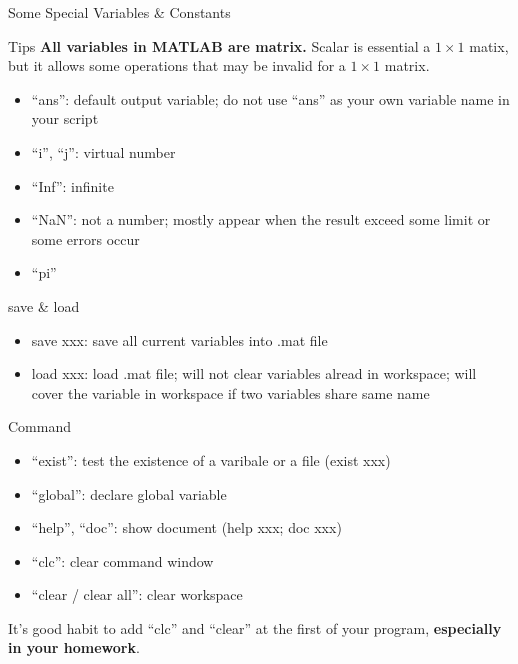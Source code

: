 \begin{frame}{Some Special Variables \& Constants}
\begin{block}{Tips}
\textbf{All variables in MATLAB are matrix.} Scalar is essential a $1\times1$ matix, but it allows some operations that may be invalid for a $1\times1$ matrix.
\end{block}
\begin{itemize}
\item ``ans'': default output variable; do not use ``ans'' as your own variable name in your script
\item ``i'', ``j'': virtual number
\item ``Inf'': infinite
\item ``NaN'': not a number; mostly appear when the result exceed some limit or some errors occur
\item ``pi''
\end{itemize}

\begin{block}{save \& load}
\begin{itemize}
\item save xxx: save all current variables into .mat file
\item load xxx: load .mat file; will not clear variables alread in workspace; will cover the variable in workspace if two variables share same name
\end{itemize}
\end{block}
\end{frame}

\begin{frame}{Command}
\begin{itemize}
\item ``exist'': test the existence of a varibale or a file (exist xxx)
\item ``global'': declare global variable
\item ``help'', ``doc'': show document (help xxx; doc xxx)
\item ``clc'': clear command window
\item ``clear / clear all'': clear workspace
\end{itemize}
It's good habit to add ``clc'' and ``clear'' at the first of your program, \textbf{especially in your homework}.
\end{frame}

